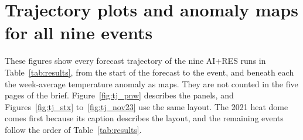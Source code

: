 \documentclass[11pt]{article}
\begin{document}
\clearpage
\raggedbottom
\makeatletter\setlength{\@fptop}{0pt}\setlength{\@fpbot}{0pt plus 1fil}\makeatother
\renewcommand{\topfraction}{0.98}
\renewcommand{\bottomfraction}{0.98}
\renewcommand{\textfraction}{0.03}
\renewcommand{\floatpagefraction}{0.75}
\setcounter{topnumber}{3}
\setcounter{bottomnumber}{3}
\setcounter{totalnumber}{4}
\setlength{\floatsep}{14pt plus 2pt minus 2pt}
\setlength{\textfloatsep}{14pt plus 2pt minus 2pt}
\setlength{\intextsep}{14pt plus 2pt minus 2pt}
\setcounter{page}{1}
\renewcommand{\thepage}{A\arabic{page}}
\setcounter{section}{0}
\renewcommand{\thesection}{\Alph{section}}
\renewcommand{\thefigure}{\thesection\arabic{figure}}
\setcounter{equation}{0}
\renewcommand{\theequation}{\thesection\arabic{equation}}
\setcounter{table}{0}
\setcounter{figure}{0}
\renewcommand{\thetable}{\thesection\arabic{table}}
\renewcommand{\theHsection}{appx.\Alph{section}}
\renewcommand{\theHfigure}{appx.\Alph{section}.\arabic{figure}}
\renewcommand{\theHtable}{appx.\Alph{section}.\arabic{table}}
\renewcommand{\theHequation}{appx.\Alph{section}.\arabic{equation}}

\section{Trajectory plots and anomaly maps for all nine events}
\label{sec:appendix}

These figures show every forecast trajectory of the nine AI+RES runs in Table~\ref{tab:results},
from the start of the forecast to the event, and beneath each the week-average temperature
anomaly as maps. They are not counted in the five pages of the brief. Figure~\ref{fig:tj_pnw}
describes the panels, and Figures~\ref{fig:tj_stx} to~\ref{fig:tj_nov23} use the same layout. The 2021 heat dome comes first because its caption
describes the layout, and the remaining events follow the order of Table~\ref{tab:results}.
\end{document}
